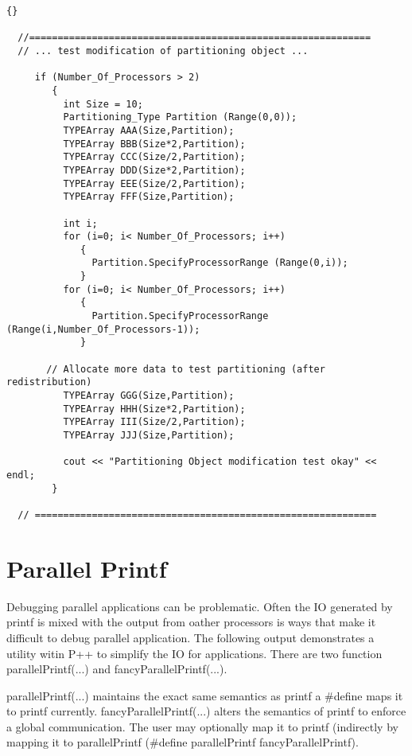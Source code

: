 \documentclass[10pt]{llncs}
\begin{document}
\vspace{0.5in}

\begin{lstlisting}{}

  //============================================================
  // ... test modification of partitioning object ...

     if (Number_Of_Processors > 2)
        {
          int Size = 10;
          Partitioning_Type Partition (Range(0,0));
          TYPEArray AAA(Size,Partition);
          TYPEArray BBB(Size*2,Partition);
          TYPEArray CCC(Size/2,Partition);
          TYPEArray DDD(Size*2,Partition);
          TYPEArray EEE(Size/2,Partition);
          TYPEArray FFF(Size,Partition);

          int i;
          for (i=0; i< Number_Of_Processors; i++)
             {
               Partition.SpecifyProcessorRange (Range(0,i));
             }
          for (i=0; i< Number_Of_Processors; i++)
             {
               Partition.SpecifyProcessorRange (Range(i,Number_Of_Processors-1));
             }

       // Allocate more data to test partitioning (after redistribution)
          TYPEArray GGG(Size,Partition);
          TYPEArray HHH(Size*2,Partition);
          TYPEArray III(Size/2,Partition);
          TYPEArray JJJ(Size,Partition);

          cout << "Partitioning Object modification test okay" << endl;
        }

  // ============================================================

\end{lstlisting}

\newpage
\section{Parallel Printf}
    Debugging parallel applications can be problematic.  Often the I\/O generated by printf is mixed
with the output from oather processors is ways that make it difficult to debug parallel application.
The following output demonstrates a utility witin P++ to simplify the I\/O for applications.  There
are two function parallelPrintf(...) and fancyParallelPrintf(...).

parallelPrintf(...) maintains the exact same semantics as printf a \#define maps it to printf
currently.  fancyParallelPrintf(...) alters the semantics of printf to enforce a global
communication.  The user may optionally map it to printf (indirectly by mapping it to parallelPrintf
(\#define parallelPrintf fancyParallelPrintf).
\end{document}
